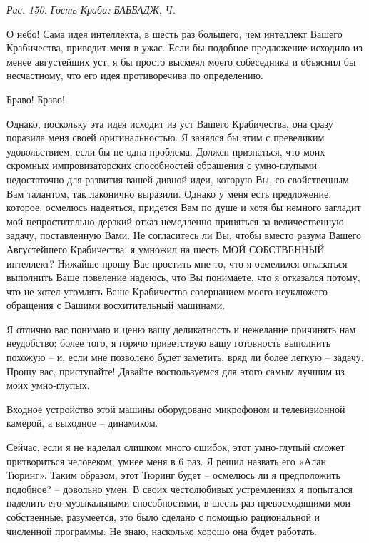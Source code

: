 \documentclass[../main.tex]{subfiles}
\begin{document}
\begin{dialogue}
\emph{Рис. 150. Гость Краба: БАББАДЖ, Ч.}

 О небо! Сама идея интеллекта, в шесть раз большего, чем интеллект Вашего Крабичества, приводит меня в ужас. Если бы подобное предложение исходило из менее августейших уст, я бы просто высмеял моего собеседника и объяснил бы несчастному, что его идея противоречива по определению.

 Браво! Браво!

 Однако, поскольку эта идея исходит из уст Вашего Крабичества, она сразу поразила меня своей оригинальностью. Я занялся бы этим с превеликим удовольствием, если бы не одна проблема. Должен признаться, что моих скромных импровизаторских способностей обращения с умно-глупыми недостаточно для развития вашей дивной идеи, которую Вы, со свойственным Вам талантом, так лаконично выразили. Однако у меня есть предложение, которое, осмелюсь надеяться, придется Вам по душе и хотя бы немного загладит мой непростительно дерзкий отказ немедленно приняться за величественную задачу, поставленную Вами. Не согласитесь ли Вы, чтобы вместо разума Вашего Августейшего Крабичества, я умножил на шесть МОЙ СОБСТВЕННЫЙ интеллект? Нижайше прошу Вас простить мне то, что я осмелился отказаться выполнить Ваше повеление надеюсь, что Вы понимаете, что я отказался потому, что не хотел утомлять Ваше Крабичество созерцанием моего неуклюжего обращения с Вашими восхитительный машинами.

 Я отлично вас понимаю и ценю вашу деликатность и нежелание причинять нам неудобство; более того, я горячо приветствую вашу готовность выполнить похожую \--- и, если мне позволено будет заметить, вряд ли более легкую \--- задачу. Прошу вас, приступайте! Давайте воспользуемся для этого самым лучшим из моих умно-глупых.


Входное устройство этой машины оборудовано микрофоном и телевизионной камерой, а выходное \--- динамиком.


 Сейчас, если я не наделал слишком много ошибок, этот умно-глупый сможет притвориться человеком, умнее меня в 6 раз. Я решил назвать его «Алан Тюринг». Таким образом, этот Тюринг будет \--- осмелюсь ли я предположить подобное? \--- довольно умен. В своих честолюбивых устремлениях я попытался наделить его музыкальными способностями, в шесть раз превосходящими мои собственные; разумеется, это было сделано с помощью рациональной и численной программы. Не знаю, насколько хорошо она будет работать.


\end{dialogue}
\end{document}
